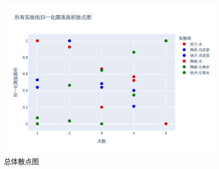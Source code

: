 \documentclass[12pt,a4paper]{ctexart}
\begin{document}
\begin{figure}[H]  %
    \centering  %
    \includegraphics[width=\textwidth]{./plot/General/scatter_normalized_overall.png}  %
    \caption{总体散点图}  %
    \label{fig:GeneralScatter}  %
\end{figure}
\end{document}
